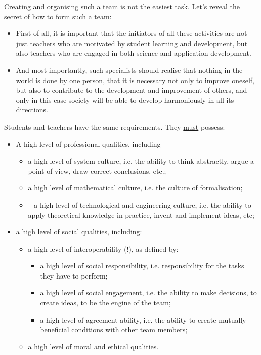 \documentclass[12pt,a4paper]{scndocument}
\begin{document}
\begin{multicols}{2}
Creating and organising such a team is not the easiest
task. Let’s reveal the secret of how to form such a team:
\begin{itemize}
\item First of all, it is important that the initiators of all these activities are not just teachers who are motivated by student learning and development, but also teachers who are engaged in both science and application development.
\item And most importantly, such specialists should realise that nothing in the world is done by one person, that it is necessary not only to improve oneself, but also to contribute to the development and improvement of others, and only in this case society will be able to develop harmoniously in all its directions.
\end{itemize}

Students and teachers have the same requirements.
They \underline{must} possess:
\begin{itemize}
\item A high level of professional qualities, including
\begin{itemize}
\item a high level of system culture, i.e. the ability to think abstractly, argue a point of view, draw correct conclusions, etc.;
\item a high level of mathematical culture, i.e. the culture of formalisation;
\item – a high level of technological and engineering culture, i.e. the ability to apply theoretical knowledge in practice, invent and implement ideas, etc;
\end{itemize}
\item a high level of social qualities, including:
\begin{itemize}
\item a high level of interoperability (!), as defined by:
\begin{itemize}
\item  a high level of social responsibility, i.e. responsibility for the tasks they have to perform;
\item a high level of social engagement, i.e. the ability to make decisions, to create ideas, to be the engine of the team;
\item a high level of agreement ability, i.e. the ability to create mutually beneficial conditions with other team members;
\end{itemize}
\item a high level of moral and ethical qualities.
\end{itemize}
\end{itemize}


\end{multicols}
\end{document}
